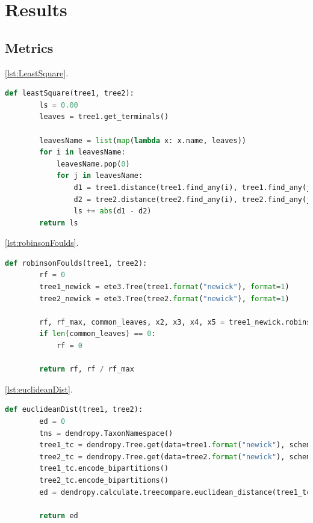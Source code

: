 \section{Results}\label{results}

\subsection{Metrics}\label{metrics}

\autoref{lst:LeastSquare}.
\begin{lstlisting}[label=lst:LeastSquare,language=Python,caption=aPhyloGeo’s leastSquare function]
    def leastSquare(tree1, tree2):
        ls = 0.00
        leaves = tree1.get_terminals()

        leavesName = list(map(lambda x: x.name, leaves))
        for i in leavesName:
            leavesName.pop(0)
            for j in leavesName:
                d1 = tree1.distance(tree1.find_any(i), tree1.find_any(j))
                d2 = tree2.distance(tree2.find_any(i), tree2.find_any(j))
                ls += abs(d1 - d2)
        return ls
\end{lstlisting}


\autoref{lst:robinsonFoulds}.
\begin{lstlisting}[label=lst:robinsonFoulds,language=Python,caption=aPhyloGeo’s robinsonFoulds function]
    def robinsonFoulds(tree1, tree2):
        rf = 0
        tree1_newick = ete3.Tree(tree1.format("newick"), format=1)
        tree2_newick = ete3.Tree(tree2.format("newick"), format=1)

        rf, rf_max, common_leaves, x2, x3, x4, x5 = tree1_newick.robinson_foulds(tree2_newick, unrooted_trees=True)
        if len(common_leaves) == 0:
            rf = 0

        return rf, rf / rf_max
\end{lstlisting}

\autoref{lst:euclideanDist}.
\begin{lstlisting}[label=lst:euclideanDist,language=Python,caption=aPhyloGeo’s euclideanDist function]
    def euclideanDist(tree1, tree2):
        ed = 0
        tns = dendropy.TaxonNamespace()
        tree1_tc = dendropy.Tree.get(data=tree1.format("newick"), schema="newick", taxon_namespace=tns)
        tree2_tc = dendropy.Tree.get(data=tree2.format("newick"), schema="newick", taxon_namespace=tns)
        tree1_tc.encode_bipartitions()
        tree2_tc.encode_bipartitions()
        ed = dendropy.calculate.treecompare.euclidean_distance(tree1_tc, tree2_tc)

        return ed
\end{lstlisting}


